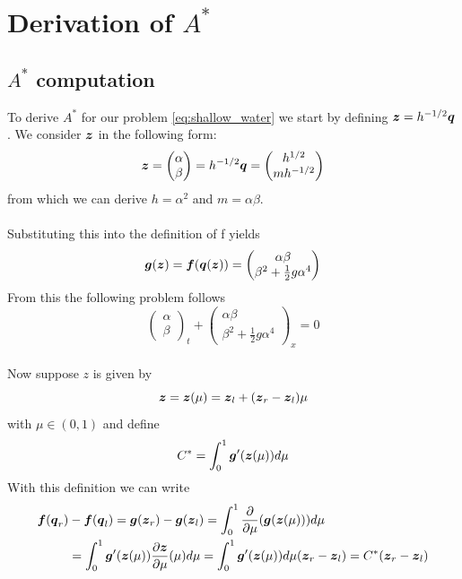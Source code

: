 \documentclass[oneside,12pt]{book}  %
\theoremstyle{plain}
\theoremstyle{definition}
\theoremstyle{remark}
\numberwithin{equation}{chapter} %
\begin{document}
\section{Derivation of $A^*$}

\subsection{$A^*$ computation}

To derive $A^*$ for our problem \ref{eq:shallow_water} we start by
defining ${\mbox{\boldmath$z$}}=h^{-1/2}{\mbox{\boldmath$q$}}$. We consider ${\mbox{\boldmath$z$}}$ in the following
form: $${\mbox{\boldmath$z$}}=\begin{pmatrix} \alpha \\ \beta \end{pmatrix}=h^{-1/2}{\mbox{\boldmath$q$}}=\begin{pmatrix} h^{1/2} \\ mh^{-1/2} \end{pmatrix} $$
from which we can derive $h=\alpha^2$ and $m=\alpha\beta$.
\\
\\
Substituting this into the definition of f yields
\begin{equation}
  \label{eq:roe_flux_z}
  {\mbox{\boldmath$g$}}({\mbox{\boldmath$z$}})={\mbox{\boldmath$f$}}({\mbox{\boldmath$q$}}({\mbox{\boldmath$z$}}))=\begin{pmatrix} \alpha\beta \\ \beta^2+\frac{1}{2}g\alpha^4 \end{pmatrix}
\end{equation}
From this the following problem follows
\begin{equation}
  \label{eq:shallow_water_z}
  \begin{pmatrix} \alpha \\ \beta \end{pmatrix}_t+\begin{pmatrix} \alpha\beta \\ \beta^2+\frac{1}{2}g\alpha^4 \end{pmatrix}_x=0
\end{equation}
\\
Now suppose $z$ is given by $${\mbox{\boldmath$z$}}={\mbox{\boldmath$z$}}(\mu)={\mbox{\boldmath$z$}}_l+({\mbox{\boldmath$z$}}_r-{\mbox{\boldmath$z$}}_l)\mu$$ with $\mu
\in (0,1)$ and define $$C^*=\int_0^1{\mbox{\boldmath$g$}}'({\mbox{\boldmath$z$}}(\mu))d\mu$$
With this definition we can write
\begin{equation}
\begin{split}
  {\mbox{\boldmath$f$}}({\mbox{\boldmath$q$}}_r)&-{\mbox{\boldmath$f$}}({\mbox{\boldmath$q$}}_l)={\mbox{\boldmath$g$}}({\mbox{\boldmath$z$}}_r)-{\mbox{\boldmath$g$}}({\mbox{\boldmath$z$}}_l)=\int_0^1\frac{\partial}{\partial
  \mu}({\mbox{\boldmath$g$}}({\mbox{\boldmath$z$}}(\mu)))d\mu \\
&=\int_0^1{\mbox{\boldmath$g$}}'({\mbox{\boldmath$z$}}(\mu))\frac{\partial
  {\mbox{\boldmath$z$}}}{\partial \mu}(\mu)d\mu
=\int_0^1{\mbox{\boldmath$g$}}'({\mbox{\boldmath$z$}}(\mu))d\mu({\mbox{\boldmath$z$}}_r-{\mbox{\boldmath$z$}}_l)=C^*({\mbox{\boldmath$z$}}_r-{\mbox{\boldmath$z$}}_l)
\end{split}
\end{equation}
\end{document}
